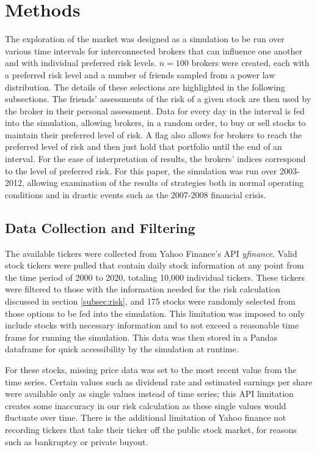 \documentclass[letterpaper, 11 pt, proceedings]{IEEEtran}
\begin{document}
	\section{Methods}\label{sec:methods}
	The exploration of the market was designed as a simulation to be run over various time intervals for interconnected brokers that can influence one another and with individual preferred risk levels. $n=100$ brokers were created, each with a preferred risk level and a number of friends sampled from a power law distribution. The details of these selections are highlighted in the following subsections. The friends' assessments of the risk of a given stock are then used by the broker in their personal assessment. Data for every day in the interval is fed into the simulation, allowing brokers, in a random order, to buy or sell stocks to maintain their preferred level of risk. A flag also allows for brokers to reach the preferred level of risk and then just hold that portfolio until the end of an interval. For the ease of interpretation of results, the brokers' indices correspond to the level of preferred risk. For this paper, the simulation was run over 2003-2012, allowing examination of the results of strategies both in normal operating conditions and in drastic events such as the 2007-2008 financial crisis.
	
	\subsection{Data Collection and Filtering}\label{subsec:data}
	The available tickers were collected from Yahoo Finance's API \textit{yfinance}. Valid stock tickers were pulled that contain daily stock information at any point from the time period of 2000 to 2020, totaling 10,000 individual tickers. These tickers were filtered to those with the information needed for the risk calculation discussed in section \ref{subsec:risk}, and 175 stocks were randomly selected from those options to be fed into the simulation. This limitation was imposed to only include stocks with necessary information and to not exceed a reasonable time frame for running the simulation. This data was then stored in a Pandas dataframe for quick accessibility by the simulation at runtime.
	
	For these stocks, missing price data was set to the most recent value from the time series. Certain values such as dividend rate and estimated earnings per share were available only as single values instead of time series; this API limitation creates some inaccuracy in our risk calculation as these single values would fluctuate over time. There is the additional limitation of Yahoo finance not recording tickers that take their ticker off the public stock market, for reasons such as bankruptcy or private buyout.
	
\end{document}
